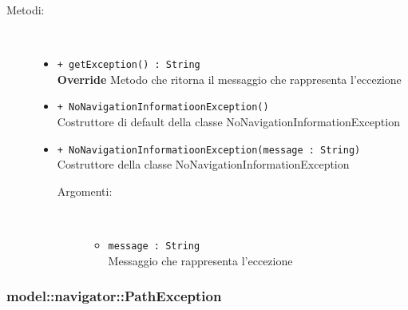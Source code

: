 \documentclass[../DefinizioneDiProdotto.tex]{subfiles}
\begin{document}
\begin{description}
\begin{itemize}
\end{itemize}
\item[Metodi:] \
\begin{itemize}
\item \texttt{+ getException() : String}\\
\textbf{Override} Metodo che ritorna il messaggio che rappresenta l'eccezione
 \item \texttt{+ NoNavigationInformatioonException()}\\
Costruttore di default della classe NoNavigationInformationException
 \item \texttt{+ NoNavigationInformatioonException(message : String)}\\
Costruttore della classe NoNavigationInformationException
 \begin{description}
\item[Argomenti:] \
\begin{itemize}
\item \texttt{message : String}\\
Messaggio che rappresenta l'eccezione\end{itemize}
\end{description}
\end{itemize}
\end{description}

\subsubsection{model::navigator::PathException}
\end{document}
